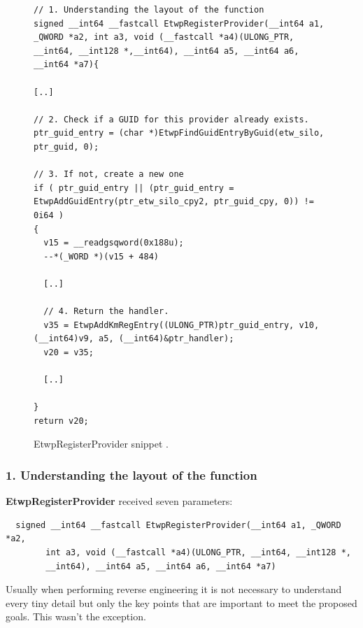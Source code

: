 \begin{figure}[H]
\begin{lstlisting}
// 1. Understanding the layout of the function 
signed __int64 __fastcall EtwpRegisterProvider(__int64 a1, _QWORD *a2, int a3, void (__fastcall *a4)(ULONG_PTR, __int64, __int128 *,__int64), __int64 a5, __int64 a6, __int64 *a7){

[..]

// 2. Check if a GUID for this provider already exists.
ptr_guid_entry = (char *)EtwpFindGuidEntryByGuid(etw_silo, ptr_guid, 0);

// 3. If not, create a new one
if ( ptr_guid_entry || (ptr_guid_entry = EtwpAddGuidEntry(ptr_etw_silo_cpy2, ptr_guid_cpy, 0)) != 0i64 )
{
  v15 = __readgsqword(0x188u);
  --*(_WORD *)(v15 + 484)
  
  [..]

  // 4. Return the handler.
  v35 = EtwpAddKmRegEntry((ULONG_PTR)ptr_guid_entry, v10, (__int64)v9, a5, (__int64)&ptr_handler);
  v20 = v35;

  [..]

}
return v20;
\end{lstlisting}
\caption[]{EtwpRegisterProvider snippet .}
\label{fig:etwpRegisterProvider_listing}
\end{figure}













  \subsubsection{\bfseries{1. Understanding the layout of the function}}
  {\bfseries EtwpRegisterProvider} received seven parameters:
  \begin{verbatim}
  signed __int64 __fastcall EtwpRegisterProvider(__int64 a1, _QWORD *a2,
        int a3, void (__fastcall *a4)(ULONG_PTR, __int64, __int128 *,
        __int64), __int64 a5, __int64 a6, __int64 *a7)
  \end{verbatim}

  Usually when performing reverse engineering it is not necessary to understand every tiny detail but only the key points that are important to meet the proposed goals. This wasn't the exception. 

